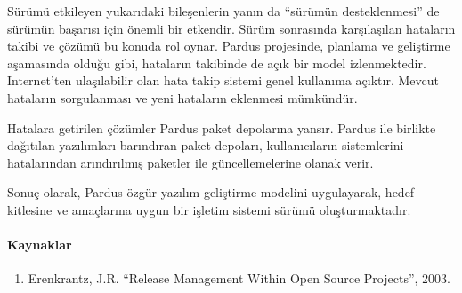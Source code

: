 \documentclass[a4]{article}
\begin{document}
Sürümü etkileyen yukarıdaki bileşenlerin yanın da ``sürümün
desteklenmesi'' de sürümün başarısı için önemli bir etkendir. Sürüm
sonrasında karşılaşılan hataların takibi ve çözümü bu konuda rol
oynar. Pardus projesinde, planlama ve geliştirme aşamasında olduğu
gibi, hataların takibinde de açık bir model
izlenmektedir. Internet'ten ulaşılabilir olan hata takip sistemi genel
kullanıma açıktır. Mevcut hataların sorgulanması ve yeni hataların
eklenmesi mümkündür.

Hatalara getirilen çözümler Pardus paket depolarına yansır. Pardus ile
birlikte dağıtılan yazılımları barındıran paket depoları,
kullanıcıların sistemlerini hatalarından arındırılmış paketler ile
güncellemelerine olanak verir.

Sonuç olarak, Pardus özgür yazılım geliştirme modelini uygulayarak,
hedef kitlesine ve amaçlarına uygun bir işletim sistemi sürümü
oluşturmaktadır.

\paragraph{Kaynaklar}
\begin{enumerate}
\item Erenkrantz, J.R. ``Release Management Within Open Source
  Projects'', 2003.
\end{enumerate}
\end{document}
